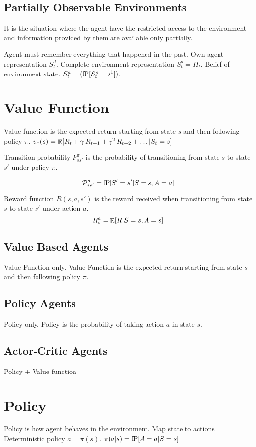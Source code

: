 \subsection{Partially Observable Environments}
It is the situation where the agent have the restricted access to the environment
and information provided by them are available only partially.

Agent must remember everything that happened in the past.
Own agent representation $S_t^d$.
Complete environment representation $S_t^a=H_t$.
Belief of environment state: $S_t^a=(\text{I\kern-0.15em P}[S_t^e=s^1])$.


\section{Value Function}
Value function is the expected return starting from state $s$ and then following policy $\pi$.
$v_{\pi}(s)=\mathop{\mathbb{E}}[R_t+\gamma\,R_{t+1}+\gamma^2\,R_{t+2}+\ldots|S_t=s]$

Transition probability $P_{ss'}^{\pi}$ is the probability of transitioning from state $s$ to state $s'$ under policy $\pi$.

\[
    \mathcal{P}_{ss'}^a=\text{I\kern-0.15em P}[S'=s'|S=s,A=a]
\]

Reward function $R(s,a,s')$ is the reward received when transitioning from state $s$ to state $s'$ under action $a$.
\[
    R_s^a=\mathop{\mathbb{E}}[R|S=s,A=s]
\]

\subsection{Value Based Agents}\label{subsec:value-based-agents}
Value Function only.
Value Function is the expected return starting from state $s$ and then following policy $\pi$.

\subsection{Policy Agents}\label{subsec:policy-agents}
Policy only.
Policy is the probability of taking action $a$ in state $s$.

\subsection{Actor-Critic Agents}\label{subsec:actor-critic-agents}
Policy + Value function


\section{Policy}
Policy is how agent behaves in the environment.
Map state to actions
Deterministic policy $a=\pi(s)$.
$\pi(a|s)=\text{I\kern-0.15em P}[A=a|S=s]$

